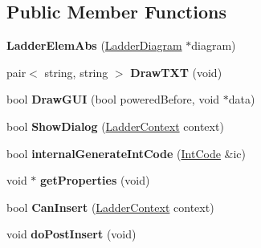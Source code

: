 \subsection*{Public Member Functions}
\begin{DoxyCompactItemize}
\item 
\hypertarget{class_ladder_elem_abs_a077f3a98f4ec4e57ca2f4773c4088daa}{{\bfseries Ladder\-Elem\-Abs} (\hyperlink{class_ladder_diagram}{Ladder\-Diagram} $\ast$diagram)}\label{class_ladder_elem_abs_a077f3a98f4ec4e57ca2f4773c4088daa}

\item 
\hypertarget{class_ladder_elem_abs_ae8b2051ef419301e679973d32eae20c6}{pair$<$ string, string $>$ {\bfseries Draw\-T\-X\-T} (void)}\label{class_ladder_elem_abs_ae8b2051ef419301e679973d32eae20c6}

\item 
\hypertarget{class_ladder_elem_abs_af5fa3f84f9ef991409d4fea9a6dc6137}{bool {\bfseries Draw\-G\-U\-I} (bool powered\-Before, void $\ast$data)}\label{class_ladder_elem_abs_af5fa3f84f9ef991409d4fea9a6dc6137}

\item 
\hypertarget{class_ladder_elem_abs_a43292e9cd8eb63f935afe7d46636629f}{bool {\bfseries Show\-Dialog} (\hyperlink{struct_ladder_context}{Ladder\-Context} context)}\label{class_ladder_elem_abs_a43292e9cd8eb63f935afe7d46636629f}

\item 
\hypertarget{class_ladder_elem_abs_a5453dad1e55023e12a9d5ffaa29449b3}{bool {\bfseries internal\-Generate\-Int\-Code} (\hyperlink{class_int_code}{Int\-Code} \&ic)}\label{class_ladder_elem_abs_a5453dad1e55023e12a9d5ffaa29449b3}

\item 
\hypertarget{class_ladder_elem_abs_aaa0e932f6fb7cd347cb0c1a520b5cc98}{void $\ast$ {\bfseries get\-Properties} (void)}\label{class_ladder_elem_abs_aaa0e932f6fb7cd347cb0c1a520b5cc98}

\item 
\hypertarget{class_ladder_elem_abs_a27bbfad73138bc8273ce15b073d69eba}{bool {\bfseries Can\-Insert} (\hyperlink{struct_ladder_context}{Ladder\-Context} context)}\label{class_ladder_elem_abs_a27bbfad73138bc8273ce15b073d69eba}

\item 
\hypertarget{class_ladder_elem_abs_a38d099f307f87782e137f23d201e69bc}{void {\bfseries do\-Post\-Insert} (void)}\label{class_ladder_elem_abs_a38d099f307f87782e137f23d201e69bc}


\end{DoxyCompactItemize}
